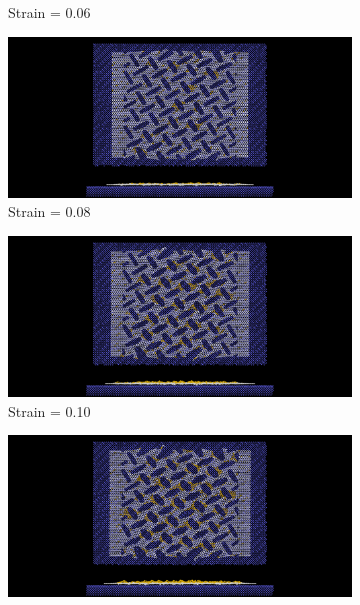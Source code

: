 \begin{figure}[H]
\begin{subfigure}[b]{0.49\textwidth}
        \caption{Strain = 0.06}
    \end{subfigure}
    \begin{subfigure}[b]{0.49\textwidth}
        \centering
        \includegraphics[width=\textwidth]{figures/baseline/contact_vs_stretch/popup/pop_stretch0008.png}
        \caption{Strain = 0.08}
    \end{subfigure}
    \hfill
    \begin{subfigure}[b]{0.49\textwidth}
        \centering
        \includegraphics[width=\textwidth]{figures/baseline/contact_vs_stretch/popup/pop_stretch0010.png}
        \caption{Strain = 0.10}
    \end{subfigure}
    \hfill
    \begin{subfigure}[b]{0.49\textwidth}
        \centering
        \includegraphics[width=\textwidth]{figures/baseline/contact_vs_stretch/popup/pop_stretch0012.png}

\end{subfigure}
\end{figure}
